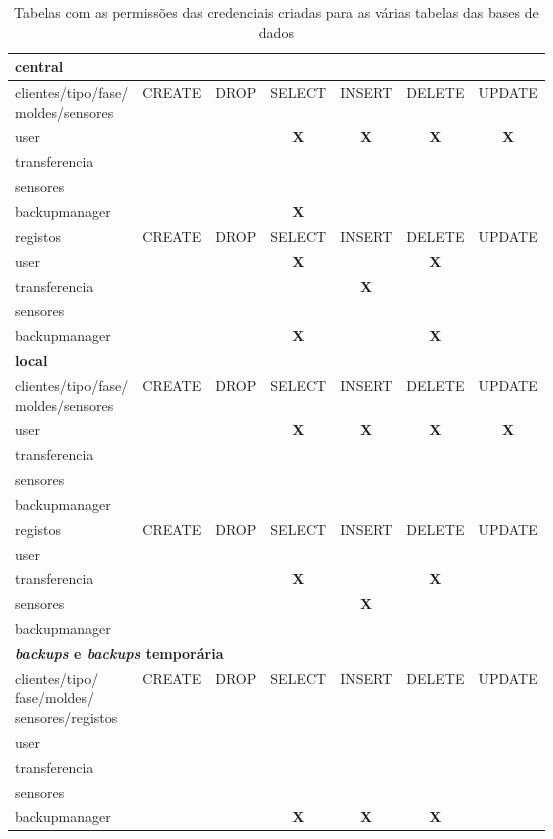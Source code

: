 \documentclass[11pt,twoside,a4paper]{report}
\begin{document}
\begin{table}[H]
	\begin{tabular}{|l|c|c|c|c|c|c|}
		\multicolumn{7}{l}{\textbf{central}} \\ \hline
		\makecell{clientes/tipo/fase/\\moldes/sensores} & CREATE & DROP & SELECT & INSERT & DELETE & UPDATE \\ \hline
		user & & & \textbf{X} & \textbf{X} & \textbf{X} & \textbf{X} \\ \hline
		transferencia & & & & & & \\ \hline
		sensores & & & & & & \\ \hline
		backupmanager & & & \textbf{X} & & & \\ \hline
		registos & CREATE & DROP & SELECT & INSERT & DELETE & UPDATE \\ \hline
		user & & & \textbf{X} & & \textbf{X} & \\ \hline
		transferencia & & & & \textbf{X} & & \\ \hline
		sensores & & & & & & \\ \hline
		backupmanager & & & \textbf{X} & & \textbf{X} & \\ \hline
		\multicolumn{7}{l}{\textbf{local}} \\ \hline
		\makecell{clientes/tipo/fase/\\moldes/sensores} & CREATE & DROP & SELECT & INSERT & DELETE & UPDATE \\ \hline
		user & & & \textbf{X} & \textbf{X} & \textbf{X} & \textbf{X} \\ \hline
		transferencia & & & & & & \\ \hline
		sensores & & & & & & \\ \hline
		backupmanager & & & & & & \\ \hline
		registos & CREATE & DROP & SELECT & INSERT & DELETE & UPDATE \\ \hline
		user & & & & & & \\ \hline
		transferencia & & & \textbf{X} & & \textbf{X} & \\ \hline
		sensores & & & & \textbf{X} & & \\ \hline
		backupmanager & & & & & & \\ \hline
		\multicolumn{7}{l}{\textbf{\textit{backups} e \textit{backups} temporária}} \\ \hline
		\makecell{clientes/tipo/\\fase/moldes/\\sensores/registos} & CREATE & DROP & SELECT & INSERT & DELETE & UPDATE \\ \hline
		user & & & & & & \\ \hline
		transferencia & & & & & & \\ \hline
		sensores & & & & & & \\ \hline
		backupmanager & & & \textbf{X} & \textbf{X} & \textbf{X} & \\ \hline
	\end{tabular}
	\caption{Tabelas com as permissões das credenciais criadas para as várias tabelas das bases de dados}
	\label{tab:utilizadores1}
\end{table}
\end{document}
